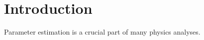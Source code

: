 \section{Introduction}
\label{sec:intro}

Parameter estimation is a crucial part of many physics analyses. 

